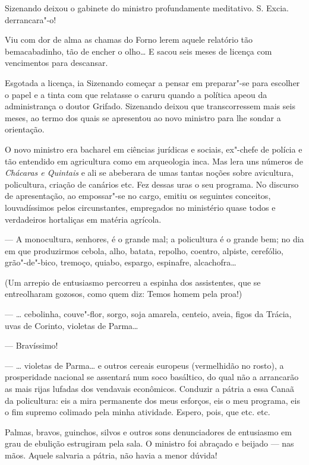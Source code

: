 Sizenando deixou o gabinete do ministro profundamente meditativo. S.
Excia. derrancara"-o!

Viu com dor de alma as chamas do Forno lerem aquele relatório tão
bemacabadinho, tão de encher o olho\ldots{} E sacou seis meses de licença com
vencimentos para descansar.

Esgotada a licença, ia Sizenando começar a pensar em preparar"-se para
escolher o papel e a tinta com que relatasse o caruru quando a política
apeou da administrança o doutor Grifado. Sizenando deixou que
transcorressem mais seis meses, ao termo dos quais se apresentou ao novo
ministro para lhe sondar a orientação.

O novo ministro era bacharel em ciências jurídicas e sociais, ex"-chefe
de polícia e tão entendido em agricultura como em arqueologia inca. Mas
lera uns números de \emph{Chácaras e Quintais} e ali se abeberara de
umas tantas noções sobre avicultura, policultura, criação de canários
etc. Fez dessas uras o seu programa. No discurso de apresentação, ao
empossar"-se no cargo, emitiu os seguintes conceitos, louvadíssimos pelos
circunstantes, empregados no ministério quase todos e verdadeiros
hortaliças em matéria agrícola.

--- A monocultura, senhores, é o grande mal; a policultura é o grande
bem; no dia em que produzirmos cebola, alho, batata, repolho, coentro,
alpiste, cerefólio, grão"-de"-bico, tremoço, quiabo, espargo, espinafre,
alcachofra\ldots{}

(Um arrepio de entusiasmo percorreu a espinha dos assistentes, que se
entreolharam gozosos, como quem diz: Temos homem pela proa!)

--- \ldots{} cebolinha, couve"-flor, sorgo, soja amarela, centeio, aveia,
figos da Trácia, uvas de Corinto, violetas de Parma\ldots{}

--- Bravíssimo!

--- \ldots{} violetas de Parma\ldots{} e outros cereais europeus (vermelhidão no
rosto), a prosperidade nacional se assentará num soco basáltico, do qual
não a arrancarão as mais rijas lufadas dos vendavais econômicos.
Conduzir a pátria a essa Canaã da policultura: eis a mira permanente dos
meus esforços, eis o meu programa, eis o fim supremo colimado pela minha
atividade. Espero, pois, que etc. etc.

Palmas, bravos, guinchos, silvos e outros sons denunciadores de
entusiasmo em grau de ebulição estrugiram pela sala. O ministro foi
abraçado e beijado --- nas mãos. Aquele salvaria a pátria, não havia a
menor dúvida!

